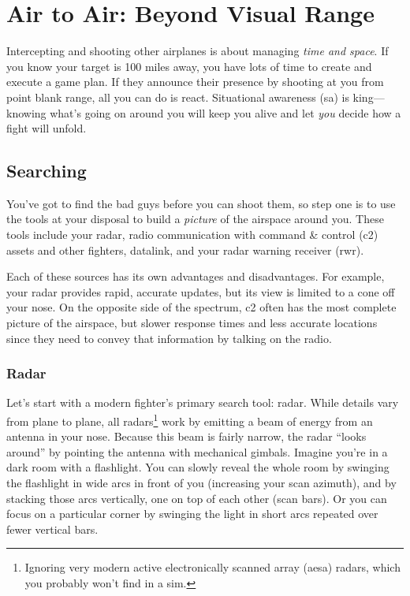 \chapter{Air to Air: Beyond Visual Range}

Intercepting and shooting other airplanes is about managing \emph{time and space}.
If you know your target is 100 miles away,
you have lots of time to create and execute a game plan.
If they announce their presence by shooting at you from point blank range,
all you can do is react.
Situational awareness \ac{(sa)} is king---knowing what's going on around
you will keep you alive and let \emph{you} decide how a fight will unfold.

\section{Searching}

You've got to find the bad guys before you can shoot them,
so step one is to use the tools at your disposal to build a \emph{picture}
of the airspace around you.
These tools include your radar,
radio communication with command \& control \ac{(c2)} assets
and other fighters, datalink,
and your radar warning receiver \ac{(rwr)}.

Each of these sources has its own advantages and disadvantages.
For example,
your radar provides rapid, accurate updates,
but its view is limited to a cone off your nose.
On the opposite side of the spectrum,
\ac{c2} often has the most complete picture of the airspace,
but slower response times and less accurate locations
since they need to convey that information by talking on the radio.

\subsection{Radar}

Let's start with a modern fighter's primary search tool: radar.
While details vary from plane to plane,
all radars\footnote{Ignoring very modern active electronically scanned array
\ac{(aesa)} radars, which you probably won't find in a sim.}
work by emitting a beam of energy from an antenna in your nose.
Because this beam is fairly narrow,
the radar ``looks around'' by pointing the antenna with mechanical gimbals.
Imagine you're in a dark room with a flashlight.
You can slowly reveal the whole room by swinging the flashlight in wide arcs
in front of you (increasing your scan azimuth),
and by stacking those arcs vertically, one on top of each other
(scan bars).
Or you can focus on a particular corner by swinging the light in short arcs
repeated over fewer vertical bars.


